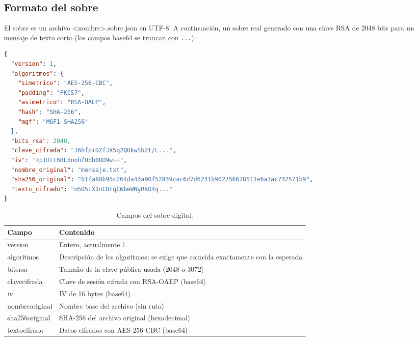 \documentclass[11pt,a4paper]{article}
\newcommand{\cod}[1]{{\ttfamily\let\_\relax\def\_{\textunderscore\penalty0\hskip0pt\relax}\def\/{\slash\penalty0\hskip0pt\relax}#1}}
\begin{document}
\subsection{Formato del sobre}
El sobre es un archivo \cod{<nombre>.sobre.json} en UTF-8. A continuación, un sobre real generado con una
clave RSA de 2048 bits para un mensaje de texto corto (los campos base64 se truncan con \texttt{...}):
\begin{lstlisting}[language=json,basicstyle=\ttfamily\scriptsize]
{
  "version": 1,
  "algoritmos": {
    "simetrico": "AES-256-CBC",
    "padding": "PKCS7",
    "asimetrico": "RSA-OAEP",
    "hash": "SHA-256",
    "mgf": "MGF1-SHA256"
  },
  "bits_rsa": 2048,
  "clave_cifrada": "J6hfp+DZfJX5q2QOkwSb2t/L...",
  "iv": "+pTDtt6BL8nohfUbb0UD9w==",
  "nombre_original": "mensaje.txt",
  "sha256_original": "b1fa88b95c264da43a90f52839cac6d7d6231b902756678511e6a7ac732571b9",
  "texto_cifrado": "m5O5IX1nCBFqCWbeWNyRKO4q..."
}
\end{lstlisting}
\begin{table}[H]
\centering
\begin{tabular}{@{}lp{10cm}@{}}
\toprule
Campo & Contenido \\ \midrule
\cod{version} & Entero, actualmente 1 \\
\cod{algoritmos} & Descripción de los algoritmos; se exige que coincida exactamente con la esperada \\
\cod{bits\_rsa} & Tamaño de la clave pública usada (2048 o 3072) \\
\cod{clave\_cifrada} & Clave de sesión cifrada con RSA-OAEP (base64) \\
\cod{iv} & IV de 16 bytes (base64) \\
\cod{nombre\_original} & Nombre base del archivo (sin ruta) \\
\cod{sha256\_original} & SHA-256 del archivo original (hexadecimal) \\
\cod{texto\_cifrado} & Datos cifrados con AES-256-CBC (base64) \\ \bottomrule
\end{tabular}
\caption{Campos del sobre digital.}
\end{table}
\end{document}
